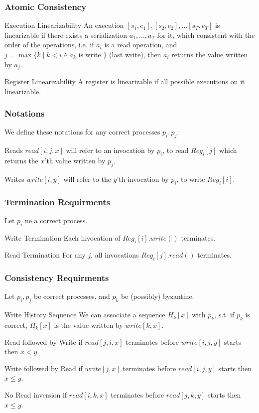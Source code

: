 \begin{frame}
    \frametitle{Atomic Consistency}
    \begin{block}{Execution Linearizability}
        An execution $[s_1, e_1], [s_2, e_2], ... [s_T, e_T]$
        is linearizable if there exists a serialization $a_1,...,a_T$ for it,
        which consistent with the order of the operations, i.e.
        if $a_i$ is a read operation, and $j=\max\{k\mid k<i\wedge a_k\text{ is write }\}$ (last write),
        then $a_i$ returns the value written by $a_j$.
    \end{block}
    \begin{alertblock}{Register Linearizability}
        A register is linearizable if all possible executions on it linearizable.
    \end{alertblock}
\end{frame}
\begin{frame}
    \frametitle{Notations}
    We define these notations for any correct processes $p_i, p_j$:
    \begin{block}{Reads}
        $read[i,j,x]$ will refer to an invocation by $p_i$, to read $Reg_i[j]$
        which returns the $x$'th value written by $p_j$.
    \end{block}
    \begin{block}{Writes}
        $write[i,y]$ will refer to the $y$'th invocation by $p_i$, to write $Reg_i[i]$.
    \end{block}

\end{frame}
\begin{frame}
    \frametitle{Termination Requirments}
    Let $p_i$ ne a correct process.
    \begin{block}{Write Termination}
        Each invocation of $Reg_i[i].write()$ terminates.
    \end{block}
    \begin{block}{Read Termination}
        For any $j$, all invocations $Reg_i[j].read()$ terminates.
    \end{block}
\end{frame}
\begin{frame}
    \frametitle{Consistency Requirments}
    Let $p_i, p_j$ be correct processes, and $p_k$ be (possibly) byzantine.
    \begin{block}{Write History Sequence}
        We can associate a sequence $H_k[x]$ with $p_k$, s.t. if $p_k$ is correct,
        $H_k[x]$ is the value written by $write[k,x]$.
    \end{block}
    \begin{block}{Read followed by Write}
        if $read[j,i,x]$ terminates before $write[i,j,y]$ starts then $x<y$.
    \end{block}
    \begin{block}{Write followed by Read}
        if $write[j,x]$ terminates before $read[i,j,y]$ starts then $x\leq y$.
    \end{block}
    \begin{block}{No Read inversion}
        if $read[i,k,x]$ terminates before $read[j,k,y]$ starts then $x\leq y$.
    \end{block}

    
\end{frame}